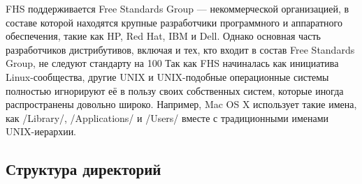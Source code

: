 FHS поддерживается Free Standards Group — некоммерческой организацией, в составе которой находятся крупные разработчики программного и аппаратного обеспечения, такие как HP, Red Hat, IBM и Dell. Однако основная часть разработчиков дистрибутивов, включая и тех, кто входит в состав Free Standards Group, не следуют стандарту на 100 %
Так как FHS начиналась как инициатива Linux-сообщества, другие UNIX и UNIX-подобные операционные системы полностью игнорируют её в пользу своих собственных систем, которые иногда распространены довольно широко. Например, Mac OS X использует такие имена, как /Library/, /Applications/ и /Users/ вместе с традиционными именами UNIX-иерархии.
\subsection{Структура директорий}

